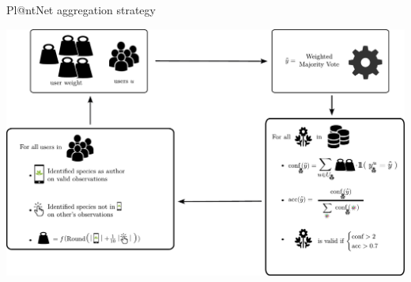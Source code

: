 \begin{frame}{Pl@ntNet aggregation strategy}
    \begin{center}
        \includegraphics[width=\textwidth]{../chapters/images_plantnet/schema_plantnet_aggregation.pdf}
    \end{center}
\end{frame}




